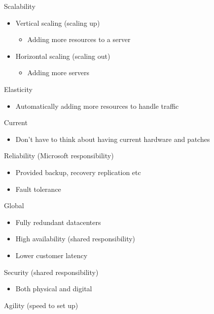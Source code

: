 \documentclass{article}[18pt]
\begin{document}
Scalability

\begin{itemize}
	\item
	Vertical scaling (scaling up)
	\begin{itemize}

		\item
		Adding more resources to a server
	\end{itemize}
	\item
	Horizontal scaling (scaling out)
	\begin{itemize}

		\item
		Adding more servers
	\end{itemize}
\end{itemize}

Elasticity

\begin{itemize}
	\tightlist
	\item
	Automatically adding more resources to handle traffic
\end{itemize}

Current

\begin{itemize}
	\tightlist
	\item
	Don't have to think about having current hardware and patches
\end{itemize}

Reliability (Microsoft responsibility)

\begin{itemize}
	\tightlist
	\item
	Provided backup, recovery replication etc
	\item
	Fault tolerance
\end{itemize}

Global

\begin{itemize}
	\tightlist
	\item
	Fully redundant datacenters
	\item
	High availability (shared responsibility)
	\item Lower customer latency
\end{itemize}

Security (shared responsibility)

\begin{itemize}
	\tightlist
	\item
	Both physical and digital
\end{itemize}
Agility (speed to set up)
\end{document}
